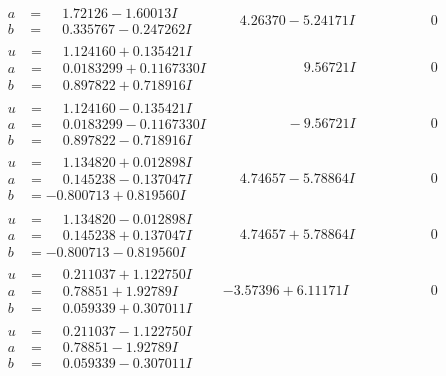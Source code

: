\documentclass[1p]{elsarticle_modified}
\theoremstyle{definition}
\begin{document}
$$\begin{array}{c|c|c}
\begin{aligned}
a &= \phantom{-}1.72126 - 1.60013 I \\
b &= \phantom{-}0.335767 - 0.247262 I\end{aligned}
 & \phantom{-}4.26370 - 5.24171 I & \phantom{-0.000000 } 0 \\ \hline\begin{aligned}
u &= \phantom{-}1.124160 + 0.135421 I \\
a &= \phantom{-}0.0183299 + 0.1167330 I \\
b &= \phantom{-}0.897822 + 0.718916 I\end{aligned}
 & \phantom{-0.000000 -}9.56721 I & \phantom{-0.000000 } 0 \\ \hline\begin{aligned}
u &= \phantom{-}1.124160 - 0.135421 I \\
a &= \phantom{-}0.0183299 - 0.1167330 I \\
b &= \phantom{-}0.897822 - 0.718916 I\end{aligned}
 & \phantom{-0.000000 } -9.56721 I & \phantom{-0.000000 } 0 \\ \hline\begin{aligned}
u &= \phantom{-}1.134820 + 0.012898 I \\
a &= \phantom{-}0.145238 - 0.137047 I \\
b &= -0.800713 + 0.819560 I\end{aligned}
 & \phantom{-}4.74657 - 5.78864 I & \phantom{-0.000000 } 0 \\ \hline\begin{aligned}
u &= \phantom{-}1.134820 - 0.012898 I \\
a &= \phantom{-}0.145238 + 0.137047 I \\
b &= -0.800713 - 0.819560 I\end{aligned}
 & \phantom{-}4.74657 + 5.78864 I & \phantom{-0.000000 } 0 \\ \hline\begin{aligned}
u &= \phantom{-}0.211037 + 1.122750 I \\
a &= \phantom{-}0.78851 + 1.92789 I \\
b &= \phantom{-}0.059339 + 0.307011 I\end{aligned}
 & -3.57396 + 6.11171 I & \phantom{-0.000000 } 0 \\ \hline\begin{aligned}
u &= \phantom{-}0.211037 - 1.122750 I \\
a &= \phantom{-}0.78851 - 1.92789 I \\
b &= \phantom{-}0.059339 - 0.307011 I\end{aligned}

\end{array}$$
\end{document}
